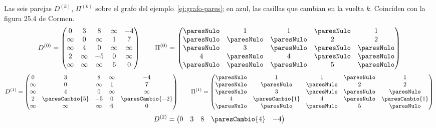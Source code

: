 \documentclass[11pt,letterpaper]{article}
\begin{document}
\begin{ejemplo}
  \label{ej:floyd-pares}
  Las seis parejas $D^{(k)}$, $\Pi^{(k)}$ sobre el grafo del
  ejemplo~\ref{ej:grafo-pares}; en azul, las casillas que cambian en
  la vuelta $k$. Coinciden con la figura 25.4 de Cormen.
  {\small
  \setlength{\arraycolsep}{3.5pt}
  \[
  D^{(0)} = \begin{pmatrix}
    0 & 3 & 8 & \infty & -4 \\
    \infty & 0 & \infty & 1 & 7 \\
    \infty & 4 & 0 & \infty & \infty \\
    2 & \infty & -5 & 0 & \infty \\
    \infty & \infty & \infty & 6 & 0
  \end{pmatrix}
  \qquad
  \Pi^{(0)} = \begin{pmatrix}
    \paresNulo & 1 & 1 & \paresNulo & 1 \\
    \paresNulo & \paresNulo & \paresNulo & 2 & 2 \\
    \paresNulo & 3 & \paresNulo & \paresNulo & \paresNulo \\
    4 & \paresNulo & 4 & \paresNulo & \paresNulo \\
    \paresNulo & \paresNulo & \paresNulo & 5 & \paresNulo
  \end{pmatrix}
  \]
  \[
  D^{(1)} = \begin{pmatrix}
    0 & 3 & 8 & \infty & -4 \\
    \infty & 0 & \infty & 1 & 7 \\
    \infty & 4 & 0 & \infty & \infty \\
    2 & \paresCambio{5} & -5 & 0 & \paresCambio{-2} \\
    \infty & \infty & \infty & 6 & 0
  \end{pmatrix}
  \qquad
  \Pi^{(1)} = \begin{pmatrix}
    \paresNulo & 1 & 1 & \paresNulo & 1 \\
    \paresNulo & \paresNulo & \paresNulo & 2 & 2 \\
    \paresNulo & 3 & \paresNulo & \paresNulo & \paresNulo \\
    4 & \paresCambio{1} & 4 & \paresNulo & \paresCambio{1} \\
    \paresNulo & \paresNulo & \paresNulo & 5 & \paresNulo
  \end{pmatrix}
  \]
  \[
  D^{(2)} = \begin{pmatrix}
    0 & 3 & 8 & \paresCambio{4} & -4 \\

\end{pmatrix}\]}
\end{ejemplo}
\end{document}
